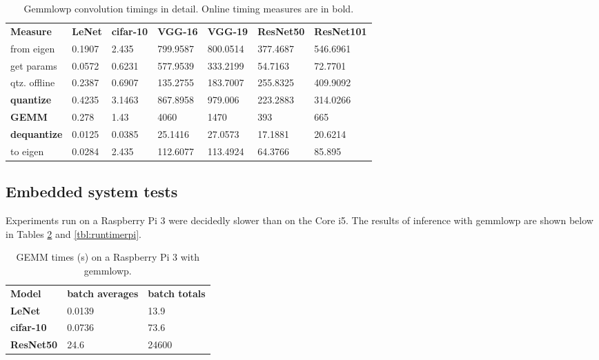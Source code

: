 \begin{table}[]
\centering
\caption[Gemmlowp convolution timings in detail]{Gemmlowp convolution timings in detail. Online timing measures are in bold.}
\label{tbl:detailedgemmlowp}
\begin{tabular}{lllllll}
\textbf{Measure}	& \textbf{LeNet} & \textbf{cifar-10} & \textbf{VGG-16} & \textbf{VGG-19} & \textbf{ResNet50} & \textbf{ResNet101} \\
from eigen & 0.1907         & 2.435              & 799.9587            & 800.0514            & 377.4687               & 546.6961                \\       
get params          & 0.0572         & 0.6231            & 577.9539         & 333.2199         & 54.7163           & 72.7701           \\
qtz. offline    & 0.2387         & 0.6907            & 135.2755        & 183.7007         & 255.8325          & 409.9092			\\   
\textbf{quantize}             & 0.4235         & 3.1463           & 867.8958        & 979.006        & 223.2883          & 314.0266            \\
\textbf{GEMM}                 & 0.278          & 1.43              & 4060            & 1470            & 393             & 665              \\       
\textbf{dequantize}           & 0.0125         & 0.0385            & 25.1416        & 27.0573        & 17.1881          & 20.6214            \\
to eigen   & 0.0284         & 2.435             & 112.6077       & 113.4924        & 64.3766          & 85.895    
\end{tabular}
\end{table}

\subsection{Embedded system tests}
Experiments run on a Raspberry Pi 3 were decidedly slower than on the Core i5. The results of inference with gemmlowp are shown below in Tables \ref{tbl:gemmtimerpi} and \ref{tbl:runtimerpi}.

\begin{table}[]
\centering
\caption[Raspberry Pi GEMM times (gemmlowp)]{GEMM times (s) on a Raspberry Pi 3 with gemmlowp.}
\label{tbl:gemmtimerpi}
\begin{tabular}{lll}

\textbf{Model}    & \textbf{batch averages}                    & \textbf{batch totals}                    \\  
\textbf{LeNet}                 & 0.0139                           & 13.9           	\\
\textbf{cifar-10}             & 0.0736                           & 73.6           	\\
\textbf{ResNet50}             	& 24.6        		          		& 24600       
\end{tabular}
\end{table}

